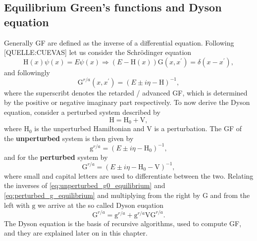 \subsection{Equilibrium Green's functions and Dyson equation}
\label{sec:eq_gf}
Generally GF are defined as the inverse of a differential equation. Following [QUELLE:CUEVAS] let us consider the Schrödinger equation 
\begin{equation}
    \mathrm{H}(x)\psi(x) = E\psi(x) \Rightarrow \left(E - \mathrm{H}(x)\right) \mathrm{G}(x, x^\prime) = \delta(x - x^\prime)
    \label{eq:def_gf_by_se},
\end{equation}
and followingly 
\begin{equation}
    \mathrm{G}^{r/a}(x, x^\prime) = \left(E \pm i \eta - \mathrm{H} \right)^{-1}
    \label{eq:gf_as_inverse_to_h},
\end{equation}
where the superscribt denotes the retarded / advanced GF, which is determined by the positive or negative imaginary part respectively. 
To now derive the Dyson equation, consider a perturbed system described by 
\begin{equation}
    \mathrm{H} = \mathrm{H}_0 + \mathrm{V}
    \label{eq:equi_gf_ham},
\end{equation}
where $\mathrm{H}_0$ is the unperturbed Hamiltonian and $\mathrm{V}$ is a perturbation. The GF of the \textbf{unperturbed} system is then given by 
\begin{equation}
    \mathrm{g}^{r/a}= \left(E \pm i \eta - \mathrm{H}_0 \right)^{-1}
    \label{eq:unperturbed_g0_equilibrium},
\end{equation}
and for the \textbf{perturbed} system by 
\begin{equation}
    \mathrm{G}^{r/a}= \left(E \pm i \eta - \mathrm{H}_0  - \mathrm{V}\right)^{-1}
    \label{eq:perturbed_g_equilibrium},
\end{equation}
where small and capital letters are used to differentiate between the two. Relating the inverses of \eqref{eq:unperturbed_g0_equilibrium} and \eqref{eq:perturbed_g_equilibrium} and multiplying from the right by $\mathrm{G}$ and from the left with $\mathrm{g}$ we arrive at the so called Dyson euqation 
\begin{equation}
    \mathrm{G}^{r/a} = \mathrm{g}^{r/a} + \mathrm{g}^{r/a} \mathrm{V} \mathrm{G}^{r/a}
    \label{eq:dyson_eq_derivation}.
\end{equation}
The Dyson equation is the basis of recursive algorithms, used to compute GF, and they are explained later on in this chapter. 


